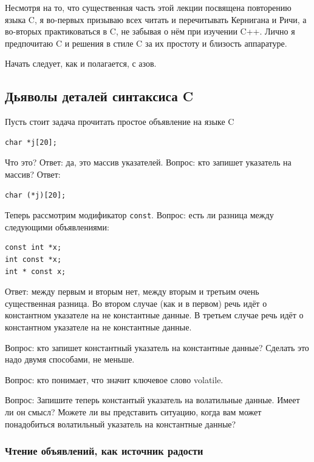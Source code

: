 \documentclass[a4paper,12pt,oneside]{article}
\begin{document}
Несмотря на то, что существенная часть этой лекции посвящена повторению языка C, я во-первых призываю всех читать и перечитывать Кернигана и Ричи, а во-вторых практиковаться в C, не забывая о нём при изучении C++. Лично я предпочитаю C и решения в стиле C за их простоту и близость аппаратуре.

Начать следует, как и полагается, с азов.

\subsection{Дьяволы деталей синтаксиса C}

Пусть стоит задача прочитать простое объявление на языке C

\begin{lstlisting}
char *j[20];
\end{lstlisting}

Что это? Ответ: да, это массив указателей. Вопрос: кто запишет указатель на массив?
Ответ:

\begin{lstlisting}
char (*j)[20];
\end{lstlisting}

Теперь рассмотрим модификатор \lstinline!const!. Вопрос: есть ли разница между следующими объявлениями:

\begin{lstlisting}
const int *x;
int const *x;
int * const x;
\end{lstlisting}

Ответ: между первым и вторым нет, между вторым и третьим очень существенная разница. Во втором случае (как и в первом) речь идёт о константном указателе на не константные данные. В третьем случае речь идёт о константном указателе на не константные данные.

Вопрос: кто запишет константный указатель на константные данные? Сделать это надо двумя способами, не меньше.

Вопрос: кто понимает, что значит ключевое слово volatile.

Вопрос: Запишите теперь константый указатель на волатильные данные. Имеет ли он смысл? Можете ли вы представить ситуацию, когда вам может понадобиться волатильный указатель на константные данные?

\subsubsection{Чтение объявлений, как источник радости}
\end{document}
